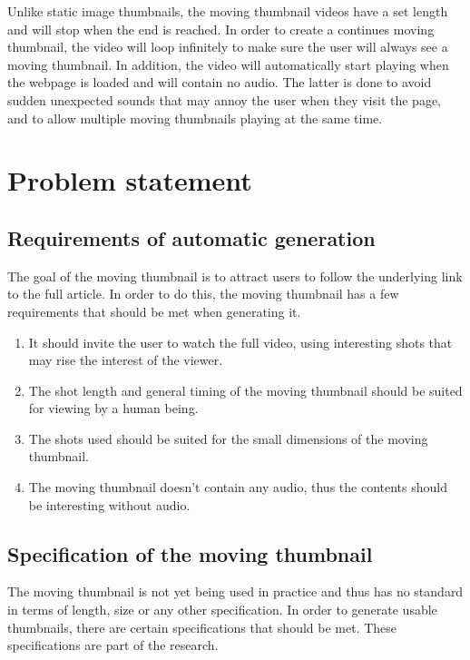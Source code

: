 \documentclass{../resources/acm_proc_article-sp}
\begin{document}
Unlike static image thumbnails, the moving thumbnail videos have a set length and will stop when the end is reached. In order to create a continues moving thumbnail, the video will loop infinitely to make sure the user will always see a moving thumbnail. In addition, the video will automatically start playing when the webpage is loaded and will contain no audio. The latter is done to avoid sudden unexpected sounds that may annoy the user when they visit the page, and to allow multiple moving thumbnails playing at the same time. 

\section{Problem statement}

\subsection{Requirements of automatic generation}
\label{sec: requirements of automatic generation}

The goal of the moving thumbnail is to attract users to follow the underlying link to the full article. In order to do this, the moving thumbnail has a few requirements that should be met when generating it.

\begin{enumerate}
  \item It should invite the user to watch the full video, using interesting shots that may rise the interest of the viewer.
  \item The shot length and general timing of the moving thumbnail should be suited for viewing by a human being.
  \item The shots used should be suited for the small dimensions of the moving thumbnail.
  \item The moving thumbnail doesn't contain any audio, thus the contents should be interesting without audio.
\end{enumerate}

\subsection{Specification of the moving thumbnail}

The moving thumbnail is not yet being used in practice and thus has no standard in terms of length, size or any other specification. In order to generate usable thumbnails, there are certain specifications that should be met. These specifications are part of the research.
\end{document}

